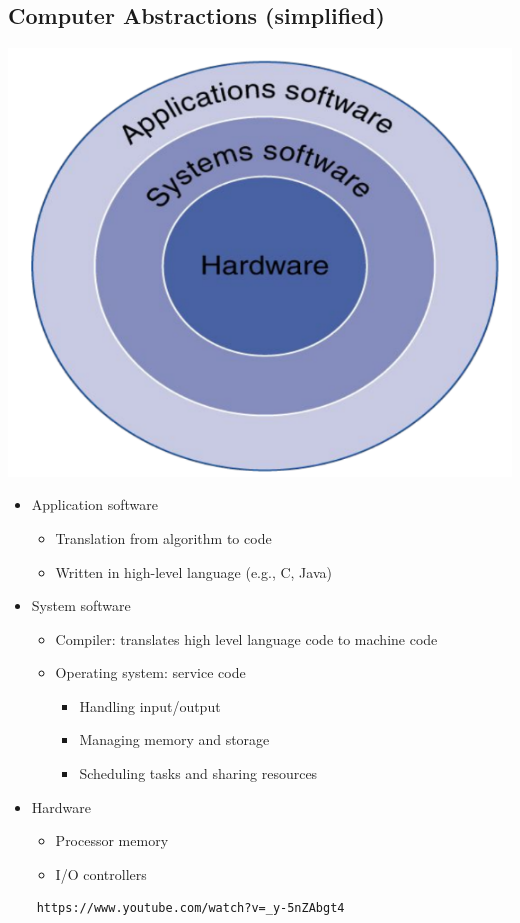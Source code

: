 \documentclass[10pt]{article}
\begin{document}
\subsection*{Computer Abstractions (simplified)}
\includegraphics*[scale=0.8]{W1_1.png}
\begin{itemize}
    \item Application software
    \begin{itemize}
        \item Translation from algorithm to code
        \item Written in high-level language (e.g., C, Java)
    \end{itemize}
    \item System software
    \begin{itemize}
        \item Compiler: translates high level language code to machine code
        \item Operating system: service code
        \begin{itemize}
            \item Handling input/output
            \item Managing memory and storage
            \item Scheduling tasks and sharing resources
        \end{itemize}
    \end{itemize}
    \item Hardware
    \begin{itemize}
        \item Processor memory
        \item I/O controllers
    \end{itemize}
\end{itemize}
\begin{verbatim}
    https://www.youtube.com/watch?v=_y-5nZAbgt4
\end{verbatim}
\end{document}
